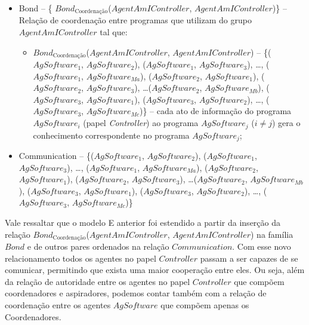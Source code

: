 \begin{itemize}
    \item Bond -- \{%
                $Bond_{\textrm{Coordenação}}$($AgentAmIController$, $AgentAmIController$)\}
    – Relação de coordenação entre programas que utilizam do grupo $AgentAmIController$  tal que:
    \begin{itemize}
        \item $Bond_{\textrm{Coordenação}}$($AgentAmIController$, $AgentAmIController$) -- \{($AgSoftware_1$, $AgSoftware_2$), ($AgSoftware_1$, $AgSoftware_3$), \ldots, ($AgSoftware_1$, $AgSoftware_{Ma}$), ($AgSoftware_2$, $AgSoftware_1$), ($AgSoftware_2$, $AgSoftware_3$), \ldots ($AgSoftware_2$, $AgSoftware_{Mb}$), ($AgSoftware_3$, $AgSoftware_1$), ($AgSoftware_3$, $AgSoftware_2$), \ldots, ($AgSoftware_3$, $AgSoftware_{Mc}$)\} – cada ato de informação do programa $AgSoftware_i$ (papel \textit{Controller}) ao programa $AgSoftware_j$ ($i \neq j$) gera o conhecimento correspondente no programa $AgSoftware_j$;
    \end{itemize}

    \item Communication -- \{($AgSoftware_1$, $AgSoftware_2$), ($AgSoftware_1$, $AgSoftware_3$), \ldots, ($AgSoftware_1$, $AgSoftware_{Ma}$), ($AgSoftware_2$, $AgSoftware_1$), ($AgSoftware_2$, $AgSoftware_3$), \ldots ($AgSoftware_2$, $AgSoftware_{Mb}$), ($AgSoftware_3$, $AgSoftware_1$), ($AgSoftware_3$, $AgSoftware_2$), \ldots, ($AgSoftware_3$, $AgSoftware_{Mc}$)\}

\end{itemize}

Vale ressaltar que o modelo E anterior foi estendido a partir da inserção da relação $Bond_{\textrm{Coordenação}}$($AgentAmIController$, $AgentAmIController$) na família $Bond$ e de outros pares ordenados na relação $Communication$. Com esse novo relacionamento todos os agentes no papel $Controller$ passam a ser capazes de se comunicar, permitindo que exista uma maior cooperação entre eles. Ou seja, além da relação de autoridade entre os agentes no papel $Controller$ que compõem coordenadores e aspiradores, podemos contar também com a relação de coordenação entre os agentes $AgSoftware$ que compõem apenas os Coordenadores.

